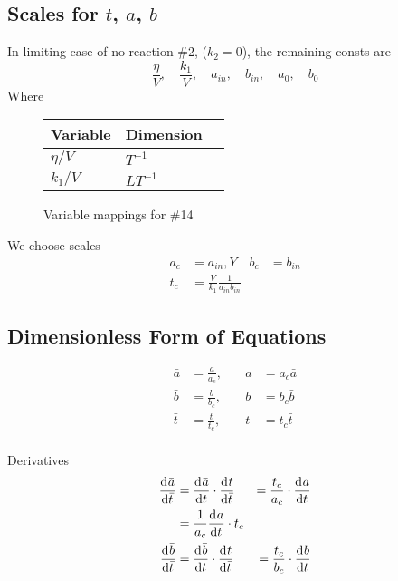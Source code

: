 \documentclass[12pt]{article}
\begin{document}
\subsection{Scales for $t$, $a$, $b$}
In limiting case of no reaction \#2, ($k_2=0$), the remaining consts are
\begin{equation}
  \frac{\eta}{V},\quad \frac{k_1}{V}, \quad a_{in}, \quad b_{in}, \quad a_0, \quad b_0
\end{equation}
Where
\begin{figure}
  \centering
  \begin{tabularx}{0.5\textwidth}{XXX}
    Variable & Dimension \\ \hline
    $\eta/V$ & $T^{-1}$  \\
    $k_1/V$ & $LT^{-1}$ \\
  \end{tabularx}
  \caption{Variable mappings for \#14}
  \label{fig:14-var-mappings}
\end{figure}
We choose scales
\begin{equation}
  \begin{aligned}
    a_c &= a_{in}, Y\quad b_c &= b_{in} \\
    t_c &= \frac{V}{k_1}\frac{1}{a_{in}b_{in}}
  \end{aligned}
\end{equation}

\subsection{Dimensionless Form of Equations}
\begin{equation}
  \begin{aligned}
    \bar{a} &= \frac{a}{a_c}, &\quad a &= a_c\bar{a} \\
    \bar{b} &= \frac{b}{b_c}, &\quad b &= b_c\bar{b} \\
    \bar{t} &= \frac{t}{t_c}, &\quad t &= t_c\bar{t} \\
  \end{aligned}
\end{equation}

Derivatives
\begin{equation}
  \begin{aligned}
    \frac{\mathrm{d}^{} {\bar{a}}}{\mathrm{d}{\bar{t}}^{}} &= \frac{\mathrm{d}^{} {\bar{a}}}{\mathrm{d}{t}^{}} \cdot \frac{\mathrm{d}^{} {t}}{\mathrm{d}{\bar{t}}^{}} &= \frac{t_c}{a_c}\cdot\frac{\mathrm{d}^{} {a}}{\mathrm{d}{t}^{}} \\
    &= \frac{1}{a_c}\frac{\mathrm{d}^{} {a}}{\mathrm{d}{t}^{}} \cdot t_c \\
    \frac{\mathrm{d}^{} {\bar{b}}}{\mathrm{d}{\bar{t}}^{}} &= \frac{\mathrm{d}^{} {\bar{b}}}{\mathrm{d}{t}^{}} \cdot \frac{\mathrm{d}^{} {t}}{\mathrm{d}{\bar{t}}^{}} &= \frac{t_c}{b_c}\cdot\frac{\mathrm{d}^{} {b}}{\mathrm{d}{t}^{}} \\
  \end{aligned}
\end{equation}
\end{document}
